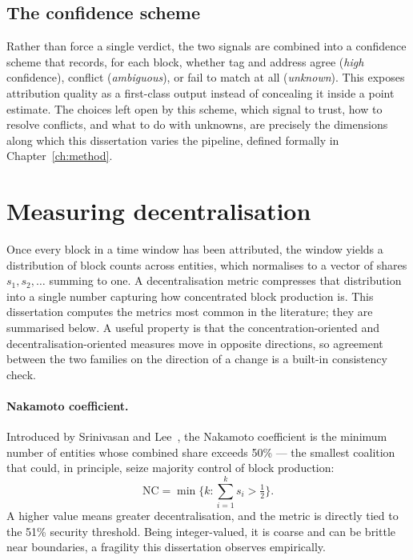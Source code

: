 \documentclass[logo,msc]{infthesis}           %
\begin{document}
\subsection{The confidence scheme}
 
Rather than force a single verdict, the two signals are combined into a
confidence scheme that records, for each block, whether tag and address agree
(\emph{high} confidence), conflict (\emph{ambiguous}), or fail to match at all
(\emph{unknown}). This exposes attribution quality as a first-class output
instead of concealing it inside a point estimate. The choices left open by this
scheme, which signal to trust, how to resolve conflicts, and what to do with
unknowns, are precisely the dimensions along which this dissertation varies
the pipeline, defined formally in Chapter~\ref{ch:method}.
 
\section{Measuring decentralisation}
\label{sec:bg-metrics}
 
Once every block in a time window has been attributed, the window yields a
distribution of block counts across entities, which normalises to a vector of
shares $s_1, s_2, \dots$ summing to one. A decentralisation metric compresses
that distribution into a single number capturing how concentrated block
production is. This dissertation computes the metrics most common in the
literature; they are summarised below. A useful property is that the
concentration-oriented and decentralisation-oriented measures move in opposite
directions, so agreement between the two families on the direction of a change
is a built-in consistency check.
 
\paragraph{Nakamoto coefficient.}
Introduced by Srinivasan and Lee~\cite{srinivasan2017quantifying}, the Nakamoto
coefficient is the minimum number of entities whose combined share exceeds
50\% --- the smallest coalition that could, in principle, seize majority
control of block production:
\[
  \mathrm{NC} = \min\Big\{k : \textstyle\sum_{i=1}^{k} s_i > \tfrac{1}{2}\Big\}.
\]
A higher value means greater decentralisation, and the metric is directly tied
to the 51\% security threshold. Being integer-valued, it is coarse and can be
brittle near boundaries, a fragility this dissertation observes empirically.
 
\end{document}
